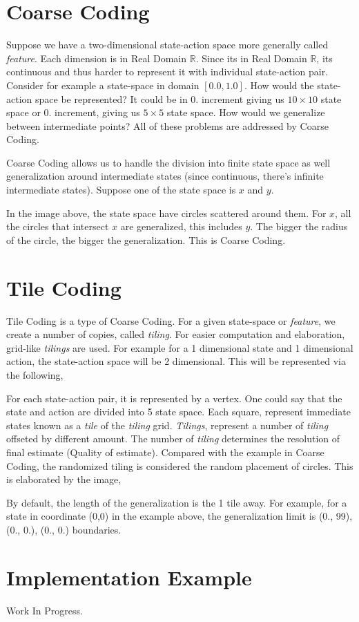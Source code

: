 \hypertarget{tileCoding_section01}{}\section{Coarse Coding}\label{tileCoding_section01}
Suppose we have a two-\/dimensional state-\/action space more generally called {\itshape feature}. Each dimension is in Real Domain $\mathbb{R}$. Since its in Real Domain $\mathbb{R}$, its continuous and thus harder to represent it with individual state-\/action pair. Consider for example a state-\/space in domain $[0.0, 1.0]$. How would the state-\/action space be represented? It could be in 0. increment giving us $10\times 10$ state space or 0. increment, giving us $5\times 5$ state space. How would we generalize between intermediate points? All of these problems are addressed by Coarse Coding.

Coarse Coding allows us to handle the division into finite state space as well generalization around intermediate states (since continuous, there's infinite intermediate states). Suppose one of the state space is $x$ and $y$.



In the image above, the state space have circles scattered around them. For $x$, all the circles that intersect $x$ are generalized, this includes $y$. The bigger the radius of the circle, the bigger the generalization. This is Coarse Coding.\hypertarget{tileCoding_section02}{}\section{Tile Coding}\label{tileCoding_section02}
Tile Coding is a type of Coarse Coding. For a given state-\/space or {\itshape feature}, we create a number of copies, called {\itshape tiling}. For easier computation and elaboration, grid-\/like {\itshape tilings} are used. For example for a 1 dimensional state and 1 dimensional action, the state-\/action space will be 2 dimensional. This will be represented via the following,



For each state-\/action pair, it is represented by a vertex. One could say that the state and action are divided into 5 state space. Each square, represent immediate states known as a {\itshape tile} of the {\itshape tiling} grid. {\itshape Tilings}, represent a number of {\itshape tiling} offseted by different amount. The number of {\itshape tiling} determines the resolution of final estimate (Quality of estimate). Compared with the example in Coarse Coding, the randomized tiling is considered the random placement of circles. This is elaborated by the image,



By default, the length of the generalization is the 1 tile away. For example, for a state in coordinate (0,0) in the example above, the generalization limit is (0., 99), (0., 0.), (0., 0.) boundaries.\hypertarget{tileCoding_section03}{}\section{Implementation Example}\label{tileCoding_section03}
Work In Progress. 
